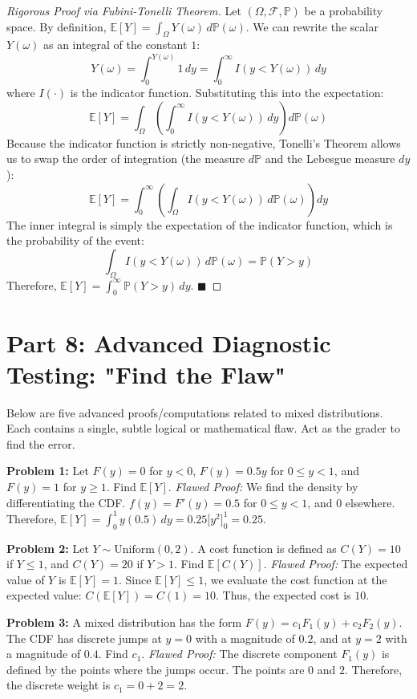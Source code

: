 \documentclass[11pt, a4paper]{article}
\theoremstyle{definition}
\theoremstyle{remark}
\newcommand{\E}{\mathbb{E}}
\newcommand{\Prob}{\mathbb{P}}
\newcommand{\F}{\mathcal{F}}
\begin{document}
\begin{proof}[Rigorous Proof via Fubini-Tonelli Theorem]
Let $(\Omega, \F, \Prob)$ be a probability space. By definition, $\E[Y] = \int_{\Omega} Y(\omega) \, d\Prob(\omega)$.
We can rewrite the scalar $Y(\omega)$ as an integral of the constant $1$:
\[ Y(\omega) = \int_{0}^{Y(\omega)} 1 \, dy = \int_{0}^{\infty} I(y < Y(\omega)) \, dy \]
where $I(\cdot)$ is the indicator function. Substituting this into the expectation:
\[ \E[Y] = \int_{\Omega} \left( \int_{0}^{\infty} I(y < Y(\omega)) \, dy \right) d\Prob(\omega) \]
Because the indicator function is strictly non-negative, Tonelli's Theorem allows us to swap the order of integration (the measure $d\Prob$ and the Lebesgue measure $dy$):
\[ \E[Y] = \int_{0}^{\infty} \left( \int_{\Omega} I(y < Y(\omega)) \, d\Prob(\omega) \right) dy \]
The inner integral is simply the expectation of the indicator function, which is the probability of the event:
\[ \int_{\Omega} I(y < Y(\omega)) \, d\Prob(\omega) = \Prob(Y > y) \]
Therefore, $\E[Y] = \int_{0}^{\infty} \Prob(Y > y) \, dy$. $\blacksquare$
\end{proof}

\section{Part 8: Advanced Diagnostic Testing: "Find the Flaw"}

Below are five advanced proofs/computations related to mixed distributions. Each contains a single, subtle logical or mathematical flaw. Act as the grader to find the error.

\textbf{Problem 1:} Let $F(y) = 0$ for $y<0$, $F(y) = 0.5y$ for $0 \le y < 1$, and $F(y) = 1$ for $y \ge 1$. Find $\E[Y]$.
\textit{Flawed Proof:} We find the density by differentiating the CDF. $f(y) = F'(y) = 0.5$ for $0 \le y < 1$, and $0$ elsewhere. Therefore, $\E[Y] = \int_{0}^{1} y(0.5) \, dy = 0.25 \Big[ y^2 \Big]_0^1 = 0.25$.

\textbf{Problem 2:} Let $Y \sim \text{Uniform}(0, 2)$. A cost function is defined as $C(Y) = 10$ if $Y \le 1$, and $C(Y) = 20$ if $Y > 1$. Find $\E[C(Y)]$.
\textit{Flawed Proof:} The expected value of $Y$ is $\E[Y] = 1$. Since $\E[Y] \le 1$, we evaluate the cost function at the expected value: $C(\E[Y]) = C(1) = 10$. Thus, the expected cost is $10$.

\textbf{Problem 3:} A mixed distribution has the form $F(y) = c_1 F_1(y) + c_2 F_2(y)$. The CDF has discrete jumps at $y=0$ with a magnitude of $0.2$, and at $y=2$ with a magnitude of $0.4$. Find $c_1$.
\textit{Flawed Proof:} The discrete component $F_1(y)$ is defined by the points where the jumps occur. The points are $0$ and $2$. Therefore, the discrete weight is $c_1 = 0 + 2 = 2$.
\end{document}
